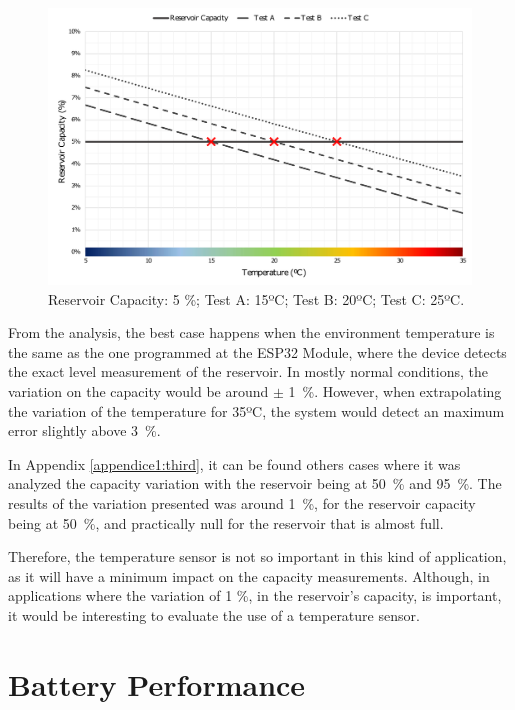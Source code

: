 \begin{figure}[h!]
    \centering
    \includegraphics[scale=0.55]{images/Results/temperature_influence/Analyse_5.pdf}
    \caption{Reservoir Capacity: 5 \%; Test A: 15ºC; Test B: 20ºC; Test C: 25ºC.}
    \label{fig:test_temperature}
\end{figure}

From the analysis, the best case happens when the environment temperature is the same as the one programmed at the ESP32 Module, where the device detects the exact level measurement of the reservoir. In mostly normal conditions, the variation on the capacity would be around $\pm$ 1~\%. However, when extrapolating the variation of the temperature for 35ºC, the system would detect an maximum error slightly above 3~\%. 

In Appendix \ref{appendice1:third}, it can be found others cases where it was analyzed the capacity variation with the reservoir being at 50~\% and 95~\%. The results of the variation presented was around 1~\%, for the reservoir capacity being at 50~\%, and practically null for the reservoir that is almost full.

Therefore, the temperature sensor is not so important in this kind of application, as it will have a minimum impact on the capacity measurements. Although, in applications where the variation of 1 \%, in the reservoir's capacity, is important, it would be interesting to evaluate the use of a temperature sensor.


\section{Battery Performance}\label{section:batteryPerformance}

